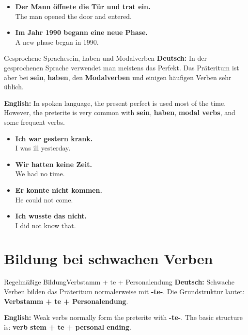\documentclass[a4paper,11pt]{article}
\newcommand{\GermanText}[1]{\textbf{Deutsch: }#1\par}
\newcommand{\EnglishText}[1]{{\small\color{SoftGray}\textbf{English: }#1\par}}
\newcommand{\ExampleItem}[2]{\item \textbf{#1}\\{\small\color{SoftGray}#2}}
\begin{document}
        \begin{exbox}
            \begin{itemize}
                \ExampleItem{Der Mann öffnete die Tür und trat ein.}{The man opened the door and entered.}
                \ExampleItem{Im Jahr 1990 begann eine neue Phase.}{A new phase began in 1990.}
            \end{itemize}
        \end{exbox}
        
        \begin{grammarentry}{Gesprochene Sprache}{sein, haben und Modalverben}
            \GermanText{In der gesprochenen Sprache verwendet man meistens das Perfekt. Das Präteritum ist aber bei \textbf{sein}, \textbf{haben}, den \textbf{Modalverben} und einigen häufigen Verben sehr üblich.}
            \EnglishText{In spoken language, the present perfect is used most of the time. However, the preterite is very common with \textbf{sein}, \textbf{haben}, \textbf{modal verbs}, and some frequent verbs.}
        \end{grammarentry}
        
        \begin{exbox}
            \begin{itemize}
                \ExampleItem{Ich war gestern krank.}{I was ill yesterday.}
                \ExampleItem{Wir hatten keine Zeit.}{We had no time.}
                \ExampleItem{Er konnte nicht kommen.}{He could not come.}
                \ExampleItem{Ich wusste das nicht.}{I did not know that.}
            \end{itemize}
        \end{exbox}
    
    
    \section{Bildung bei schwachen Verben}
        
        \begin{grammarentry}{Regelmäßige Bildung}{Verbstamm + te + Personalendung}
            \GermanText{Schwache Verben bilden das Präteritum normalerweise mit \textbf{-te-}. Die Grundstruktur lautet: \textbf{Verbstamm + te + Personalendung}.}
            \EnglishText{Weak verbs normally form the preterite with \textbf{-te-}. The basic structure is: \textbf{verb stem + te + personal ending}.}
        \end{grammarentry}
        
\end{document}
